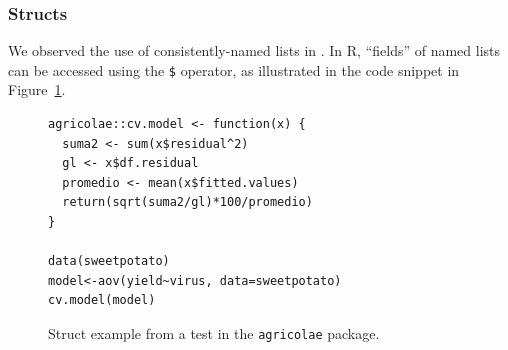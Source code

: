\documentclass[acmsmall,review,anonymous]{acmart}\settopmatter{printfolios=true,printccs=false,printacmref=false}
\newcommand{\code}[1]{{\lstinline[style=Rin]!#1!}\xspace}
\begin{document}
%
%



%
%
\subsubsection{Structs}
\label{subsec:structs}


We observed the use of consistently-named lists in .
In R, ``fields'' of named lists can be accessed using the \code{$} operator, as illustrated in the code snippet in Figure~\ref{fig:struct-ex}.

\begin{figure}[htbp]
\begin{center}

\begin{lstlisting}
agricolae::cv.model <- function(x) {
  suma2 <- sum(x$residual^2)
  gl <- x$df.residual
  promedio <- mean(x$fitted.values)
  return(sqrt(suma2/gl)*100/promedio)
}

data(sweetpotato)
model<-aov(yield~virus, data=sweetpotato)
cv.model(model)
\end{lstlisting}

\caption{Struct example from a test in the \code{agricolae} package.}
\label{fig:struct-ex}
\end{center}
\end{figure}
\end{document}
